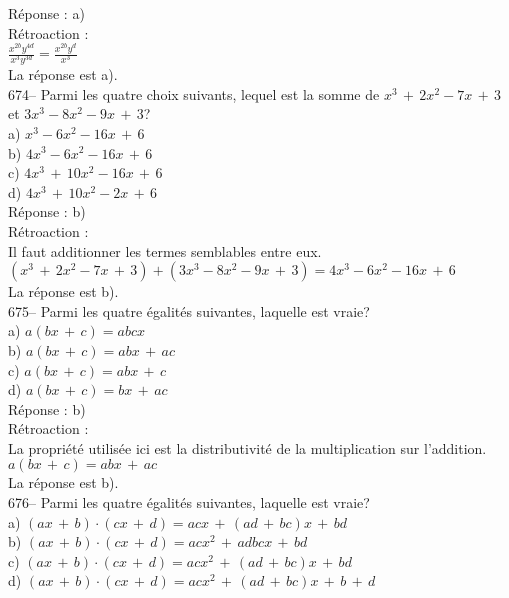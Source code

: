 ﻿\documentclass[letterpaper, 12pt]{article}
\begin{document}
R\'eponse : a)\\

R\'etroaction : \\[2mm]
$\frac{x^{2b}y^{4d}}{x^{3}y^{3d}}=\frac{x^{2b}y^{d}}{x^{3}}$\\[2mm]
La r\'eponse est a).\\


674-- Parmi les quatre choix suivants, lequel est la somme de
$x^{3}\,+\,2x^{2}-7x\,+\,3$ et $3x^{3}-8x^{2}-9x\,+\,3$?\\
a) $x^{3}-6x^{2}-16x\,+\,6$\\
b) $4x^{3}-6x^{2}-16x\,+\,6$\\
c) $4x^{3}\,+\,10x^{2}-16x\,+\,6$\\
d) $4x^{3}\,+\,10x^{2}-2x\,+\,6$\\

R\'eponse : b)\\

R\'etroaction : \\
Il faut additionner les termes semblables entre eux.\\
$\left( x^{3}\,+\,2x^{2}-7x\,+\,3\right)  + \left(
3x^{3}-8x^{2}-9x\,+\,3\right) =4x^{3}-6x^{2}-16x\,+\,6$\\
La r\'eponse est b).\\

675-- Parmi les quatre \'egalit\'es suivantes, laquelle est vraie?\\
a) $a\left( bx\,+\,c\right) =abcx$\\
b) $a\left( bx\,+\,c\right) =abx\,+\,ac$\\
c) $a\left( bx\,+\,c\right) =abx\,+\,c$\\
d) $a\left( bx\,+\,c\right) =bx\,+\,ac$\\

R\'eponse : b)\\

R\'etroaction : \\
La propri\'et\'e utilis\'ee ici est la distributivit\'e de la multiplication
sur l'addition.\\
$a\left( bx\,+\,c\right) =abx\,+\,ac$\\
La r\'eponse est b).\\

676-- Parmi les quatre \'egalit\'es suivantes, laquelle est vraie?\\
a) $\left( ax\,+\,b\right) \cdot\left( cx\,+\,d\right) =acx\,+\,\left(
ad\,+\,bc\right)x \,+\,bd$\\
b) $\left( ax\,+\,b\right) \cdot\left( cx\,+\,d\right) =acx^2\,+\,adbcx
\,+\,bd$\\
c) $\left( ax\,+\,b\right) \cdot\left( cx\,+\,d\right) =acx^2\,+\,\left(
ad\,+\,bc\right)x \,+\,bd$\\
d) $\left( ax\,+\,b\right) \cdot\left( cx\,+\,d\right) =acx^2\,+\,\left(
ad\,+\,bc\right)x \,+\,b\,+\,d$\\
\end{document}
